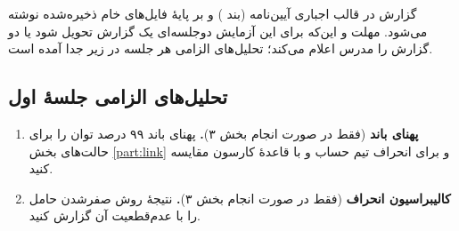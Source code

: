 \documentclass[a4paper,11pt]{article}
\begin{document}
گزارش در قالب اجباری آیین‌نامه (بند
)
و بر پایهٔ فایل‌های خام ذخیره‌شده نوشته می‌شود. مهلت و این‌که برای این آزمایش دوجلسه‌ای یک گزارش تحویل شود یا دو گزارش را مدرس اعلام می‌کند؛ تحلیل‌های الزامی هر جلسه در زیر جدا آمده است.

\subsection{تحلیل‌های الزامی جلسهٔ اول}
\begin{enumerate}
\item \textbf{پهنای باند} (فقط در صورت انجام بخش ۳)\textbf{.} پهنای باند ۹۹ درصد توان را برای حالت‌های بخش
\ref{part:link}
و برای انحراف تیم حساب و با قاعدهٔ کارسون مقایسه کنید.
\item \textbf{کالیبراسیون انحراف} (فقط در صورت انجام بخش ۳)\textbf{.} نتیجهٔ روش صفرشدن حامل را با عدم‌قطعیت آن گزارش کنید.
\end{enumerate}

\end{document}
